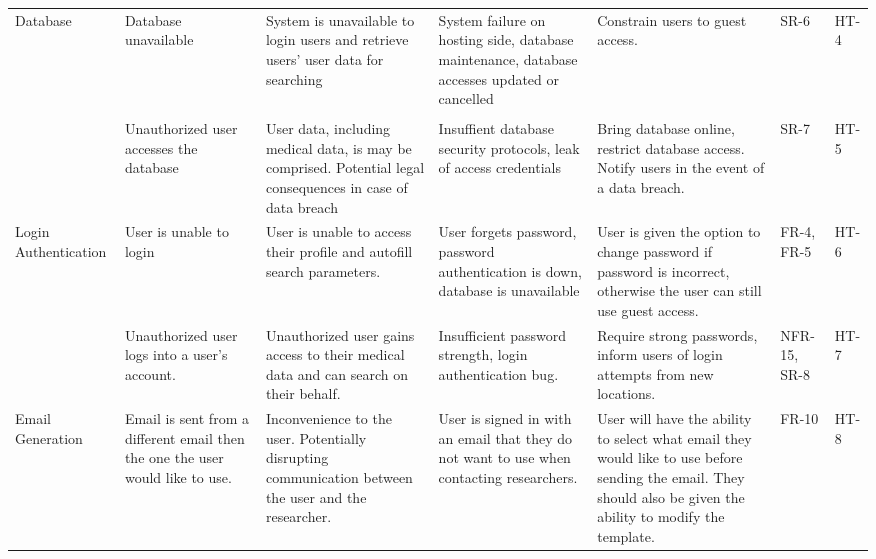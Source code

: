 \documentclass{article}
\begin{document}
\begin{table}[H]
{\begin{tabular}{|p{3cm}|p{3cm}p{3cm}p{3cm}p{3cm}p{3cm}p{3cm}|}
      \hline
      Database                                 & Database unavailable                                                          & System is unavailable to login users and retrieve users' user data for searching                                      & System failure on hosting side, database maintenance, database accesses updated or cancelled     & Constrain users to guest access.                                                                                                                               & SR-6              & HT-4   \\ \\\cline{2-7}
                                               & Unauthorized user accesses the database                                       & User data, including medical data, is may be comprised. Potential legal consequences in case of data breach           & Insuffient database security protocols, leak of access credentials                               & Bring database online, restrict database access. Notify users in the event of a data breach.                                                                   & SR-7              & HT-5   \\
      \hline
      Login Authentication                     & User is unable to login                                                       & User is unable to access their profile and autofill search parameters.                                                & User forgets password, password authentication is down, database is unavailable                  & User is given the option to change password if password is incorrect, otherwise the user can still use guest access.                                           & FR-4, FR-5        & HT-6   \\\cline{2-7}
                                               & Unauthorized user logs into a user's account.                                 & Unauthorized user gains access to their medical data and can search on their behalf.                                  & Insufficient password strength, login authentication bug.                                        & Require strong passwords, inform users of login attempts from new locations.                                                                                   & NFR-15, SR-8      & HT-7   \\
      \hline
      Email Generation                         & Email is sent from a different email then the one the user would like to use. & Inconvenience to the user. Potentially disrupting communication between the user and the researcher.                  & User is signed in with an email that they do not want to use when contacting researchers.        & User will have the ability to select what email they would like to use before sending the email. They should also be given the ability to modify the template. & FR-10             & HT-8   \\\cline{2-7}

\end{tabular}}
\end{table}
\end{document}
